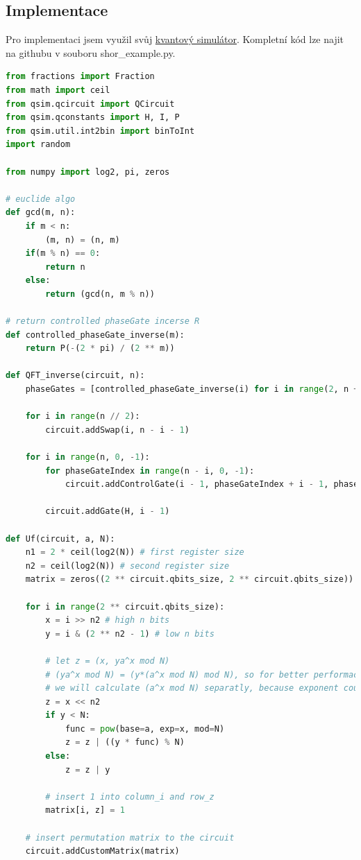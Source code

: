 \documentclass[11pt]{article}
\begin{document}
\subsection{Implementace}
Pro implementaci jsem využil svůj \hyperref[sec:QuantumEmulator]{kvantový simulátor}.
Kompletní kód lze najit na githubu v souboru shor\_example.py.
\begin{lstlisting}[language=Python, caption=Shor algorithm]
from fractions import Fraction
from math import ceil
from qsim.qcircuit import QCircuit
from qsim.qconstants import H, I, P
from qsim.util.int2bin import binToInt
import random

from numpy import log2, pi, zeros

# euclide algo
def gcd(m, n):
    if m < n: 
        (m, n) = (n, m)
    if(m % n) == 0:
        return n 
    else:
        return (gcd(n, m % n))

# return controlled phaseGate incerse R
def controlled_phaseGate_inverse(m):
    return P(-(2 * pi) / (2 ** m))

def QFT_inverse(circuit, n):
    phaseGates = [controlled_phaseGate_inverse(i) for i in range(2, n + 1)]

    for i in range(n // 2):
        circuit.addSwap(i, n - i - 1)

    for i in range(n, 0, -1):
        for phaseGateIndex in range(n - i, 0, -1):
            circuit.addControlGate(i - 1, phaseGateIndex + i - 1, phaseGates[phaseGateIndex - 1])

        circuit.addGate(H, i - 1)

def Uf(circuit, a, N):
    n1 = 2 * ceil(log2(N)) # first register size
    n2 = ceil(log2(N)) # second register size
    matrix = zeros((2 ** circuit.qbits_size, 2 ** circuit.qbits_size)) # fill matrix with zeros

    for i in range(2 ** circuit.qbits_size):
        x = i >> n2 # high n bits
        y = i & (2 ** n2 - 1) # low n bits

        # let z = (x, ya^x mod N)
        # (ya^x mod N) = (y*(a^x mod N) mod N), so for better performace
        # we will calculate (a^x mod N) separatly, because exponent could be large
        z = x << n2
        if y < N:
            func = pow(base=a, exp=x, mod=N) 
            z = z | ((y * func) % N) 
        else:
            z = z | y

        # insert 1 into column_i and row_z
        matrix[i, z] = 1
    
    # insert permutation matrix to the circuit
    circuit.addCustomMatrix(matrix)


\end{lstlisting}
\end{document}
